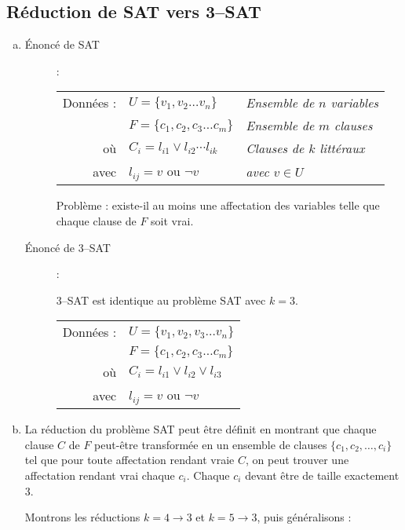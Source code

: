\subsection{Réduction de SAT vers 3--SAT}
\begin{enumerate}[(a)]
\item \begin{description}
\item[Énoncé de SAT] : \\
\begin{tabular}{r l l}
Données : & $ U = \lbrace v_1, v_2 \ldots v_n \rbrace $ & \emph{Ensemble de $n$ variables}\\
& $ F = \lbrace c_1, c_2, c_3 \ldots c_m \rbrace $ & \emph{Ensemble de $m$ clauses}\\
où & $ C_i = l_{i1} \vee l_{i2} \cdots l_{ik} $ & \emph{Clauses de $k$ littéraux}\\
avec & $ l_{ij} = v$ ou $ \neg v $ & \emph{avec $v \in U$} \\
\end{tabular}

Problème : existe-il au moins une affectation des variables telle que chaque clause de $F$ soit vrai.

\item [Énoncé de 3--SAT] : 

3--SAT est identique au problème SAT avec $k = 3$.\\
\begin{tabular}{r l}
Données : & $ U = \lbrace v_1, v_2, v_3 \ldots v_n \rbrace $\\
& $ F = \lbrace c_1, c_2, c_3 \ldots c_m \rbrace $\\
où & $ C_i = l_{i1} \vee l_{i2} \vee l_{i3} $\\
avec & $ l_{ij} = v$ ou $ \neg v$\\
\end{tabular}
\end{description}
\item La réduction du problème SAT peut être définit en montrant que chaque clause $C$ de $F$ peut-être transformée en un ensemble de clauses $\lbrace c_1, c_2, \ldots, c_i \rbrace$ tel que pour toute affectation rendant vraie $C$, on peut trouver une affectation rendant vrai chaque $c_i$. Chaque $c_i$ devant être de taille exactement 3.%

Montrons les réductions $k = 4 \rightarrow 3$ et $k = 5 \rightarrow 3$, puis généralisons :

\end{enumerate}
